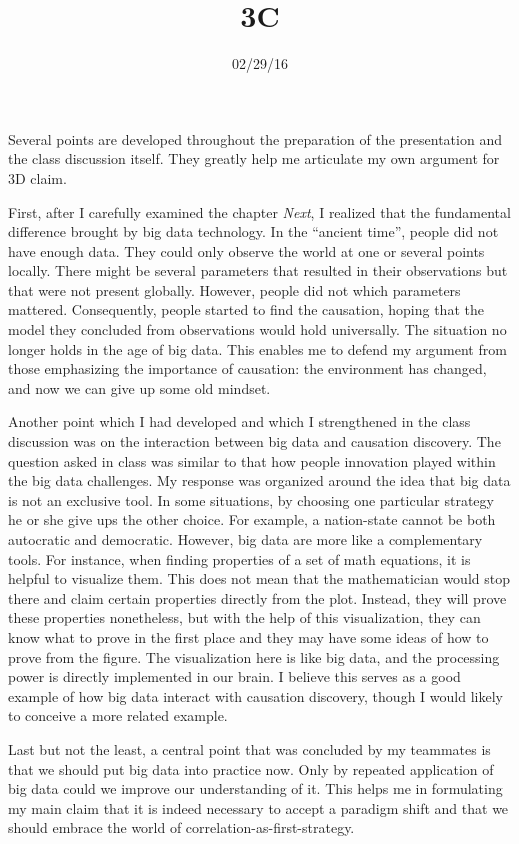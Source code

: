\documentclass{writing}
\title{3C}
\date{02/29/16}
\begin{document}
\maketitle

Several points are developed throughout the preparation of the
presentation and the class discussion itself. They greatly help me
articulate my own argument for 3D claim.

First, after I carefully examined the chapter \emph{Next}, I realized
that the fundamental difference brought by big data technology. In the
``ancient time'', people did not have enough data. They could only
observe the world at one or several points locally. There might be
several parameters that resulted in their observations but that were not
present globally. However, people did not which parameters mattered.
Consequently, people started to find the causation, hoping that the
model they concluded from observations would hold universally. The
situation no longer holds in the age of big data. This enables me to
defend my argument from those emphasizing the importance of causation:
the environment has changed, and now we can give up some old mindset.

Another point which I had developed and which I strengthened in the
class discussion was on the interaction between big data and causation
discovery. The question asked in class was similar to that how people
innovation played within the big data challenges. My response was
organized around the idea that big data is not an exclusive tool. In
some situations, by choosing one particular strategy he or she give ups
the other choice. For example, a nation-state cannot be both autocratic
and democratic. However, big data are more like a complementary tools.
For instance, when finding properties of a set of math equations, it is
helpful to visualize them. This does not mean that the mathematician
would stop there and claim certain properties directly from the plot.
Instead, they will prove these properties nonetheless, but with the help
of this visualization, they can know what to prove in the first place
and they may have some ideas of how to prove from the figure. The
visualization here is like big data, and the processing power is
directly implemented in our brain. I believe this serves as a good
example of how big data interact with causation discovery, though I
would likely to conceive a more related example.

Last but not the least, a central point that was concluded by my
teammates is that we should put big data into practice now. Only by
repeated application of big data could we improve our understanding of
it. This helps me in formulating my main claim that it is indeed
necessary to accept a paradigm shift and that we should embrace the
world of correlation-as-first-strategy.
\end{document}
